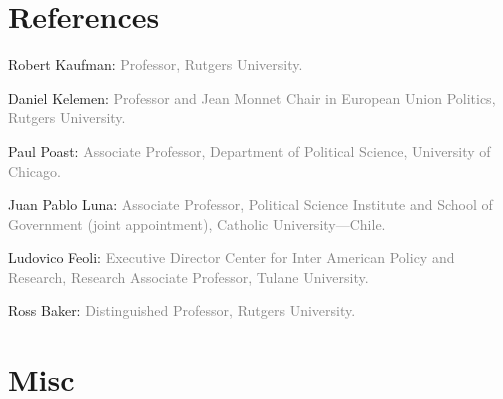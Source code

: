 \documentclass[letterpaper]{article}
\renewenvironment{itemize}{
  \begin{list}{}{
    \setlength{\leftmargin}{1.5em}
  }
}{
  \end{list}
}
\begin{document}
\section*{References}
\begin{itemize}
\item[\textcolor{gray}{\textbullet}] Robert Kaufman: {\textcolor{gray}{\scriptsize Professor, Rutgers University.}}
\item[\textcolor{gray}{\textbullet}] Daniel Kelemen: {\textcolor{gray}{\scriptsize Professor and Jean Monnet Chair in European Union Politics, Rutgers University.}}
\item[\textcolor{gray}{\textbullet}] Paul Poast: {\textcolor{gray}{\scriptsize Associate Professor, Department of Political Science, University of Chicago.}}
\item[\textcolor{gray}{\textbullet}] Juan Pablo Luna: {\textcolor{gray}{\scriptsize Associate Professor, Political Science Institute and School of Government (joint appointment), Catholic University---Chile.}}
\item[\textcolor{gray}{\textbullet}] Ludovico Feoli: {\textcolor{gray}{\scriptsize Executive Director Center for Inter American Policy and Research, Research Associate Professor, Tulane University.}}
\item[\textcolor{gray}{\textbullet}] Ross Baker: {\textcolor{gray}{\scriptsize Distinguished Professor, Rutgers University.}}
\end{itemize}




\section*{Misc}
{\unskip}




\bigskip
\end{document}
